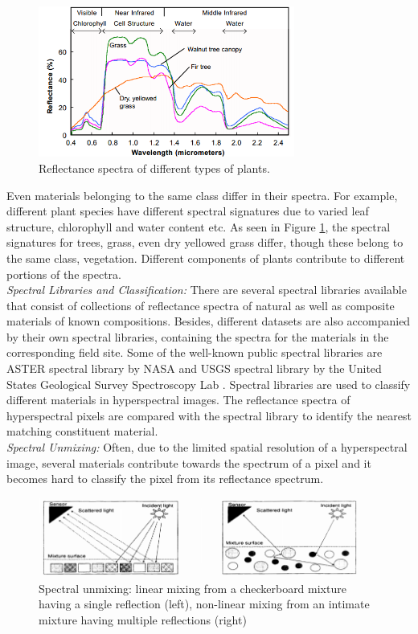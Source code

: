 \documentclass[12pt,twoside]{article}
\theoremstyle{plain}
\theoremstyle{definition}
\theoremstyle{remark}
\newcommand{\forceindent}{\leavevmode{\parindent=2em\indent}}
\begin{document}
\begin{figure}[hbtp]
\centering
\includegraphics[width=0.75\textwidth]{src/plant_spectra.png}
\caption{Reflectance spectra of different types of plants. \cite{smith2012} }
\label{fig:plant_spec}
\end{figure}
Even materials belonging to the same class differ in their spectra. For example, different plant species have different spectral signatures due to varied leaf structure, chlorophyll and water content etc. As seen in Figure \ref{fig:plant_spec}, the spectral signatures for trees, grass, even dry yellowed grass differ, though these belong to the same class, vegetation. Different components of plants contribute to different portions of the spectra.\\
\forceindent \textit{Spectral Libraries and Classification:} There are several spectral libraries available that consist of collections of reflectance spectra of natural as well as composite materials of known compositions. Besides, different datasets are also accompanied by their own spectral libraries, containing the spectra for the materials in the corresponding field site. Some of the well-known public spectral libraries are ASTER spectral library by NASA \cite{baldridge2009aster} and USGS spectral library by the United States Geological Survey Spectroscopy Lab \cite{clark1993us}. Spectral libraries are used to classify different materials in hyperspectral images. The reflectance spectra of hyperspectral pixels are compared with the spectral library to identify the nearest matching constituent material.\\
\forceindent \textit{Spectral Unmixing:} Often, due to the limited spatial resolution of a hyperspectral image, several materials contribute towards the spectrum of a pixel and it becomes hard to classify the pixel from its reflectance spectrum.
\begin{figure}[hbtp]
\centering
\includegraphics[width=0.95\textwidth]{src/spectral_unmixing.png}
\caption{Spectral unmixing: linear mixing from a checkerboard mixture having a single reflection (left), non-linear mixing from an intimate mixture having multiple reflections (right) \cite{keshava2000algorithm}}
\label{fig:unmix}
\end{figure}
\end{document}
